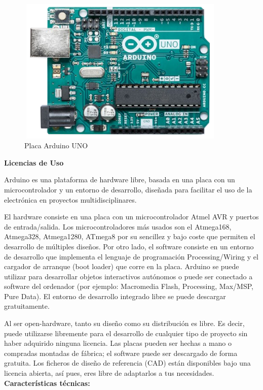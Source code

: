 \documentclass[12pt]{report}%
\begin{document}
\begin{figure}[H]
\centering
	 \includegraphics[width=10cm, height=7cm]{Arduino1.png}
	 \caption[Placa Arduino UNO]{Placa Arduino UNO}
	 	 \label{fig:arduino}
\end{figure}



\textbf{Licencias de Uso}

Arduino es una plataforma de hardware libre, basada en una placa con un microcontrolador y un entorno de desarrollo, diseñada para facilitar el uso de la electrónica en proyectos multidisciplinares. 

El hardware consiste en una placa con un microcontrolador Atmel AVR y puertos de entrada/salida. Los microcontroladores más usados son el Atmega168, Atmega328, Atmega1280, ATmega8 por su sencillez y bajo coste que permiten el desarrollo de múltiples diseños. Por otro lado, el software consiste en un entorno de desarrollo que implementa el lenguaje de programación Processing/Wiring y el cargador de arranque (boot loader) que corre en la placa. Arduino se puede utilizar para desarrollar objetos interactivos autónomos o puede ser conectado a software del ordenador (por ejemplo: Macromedia Flash, Processing, Max/MSP, Pure Data). El entorno de desarrollo integrado libre se puede descargar gratuitamente. 

Al ser open-hardware, tanto su diseño como su distribución es libre. Es decir, puede utilizarse libremente para el desarrollo de cualquier tipo de proyecto sin haber adquirido ninguna licencia. 
Las placas pueden ser hechas a mano o compradas montadas de fábrica; el software puede ser descargado de forma gratuita. Los ficheros de diseño de referencia (CAD) están disponibles bajo una licencia abierta, así pues, eres libre de adaptarlos a tus necesidades.\\
\textbf{Características técnicas:}\\
\end{document}
